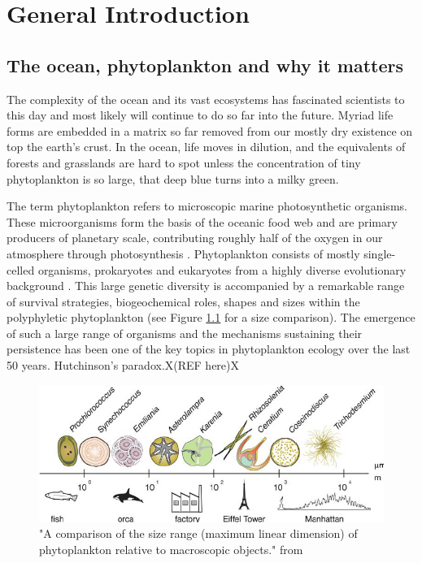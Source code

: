 \chapter{General Introduction}

\section{The ocean, phytoplankton and why it matters}
The complexity of the ocean and its vast ecosystems has fascinated scientists to this day and most likely will continue to do so far into the future. Myriad life forms are embedded in a matrix so far removed from our mostly dry existence on top the earth’s crust. In the ocean, life moves in dilution, and the equivalents of forests and grasslands are hard to spot unless the concentration of tiny phytoplankton is so large, that deep blue turns into a milky green.

The term phytoplankton refers to microscopic marine photosynthetic organisms. These microorganisms form the basis of the oceanic food web and are primary producers of planetary scale, contributing roughly half of the oxygen in our atmosphere through photosynthesis \citep{Field2009}. Phytoplankton consists of mostly single-celled organisms, prokaryotes and eukaryotes from a highly diverse evolutionary background \citep{Falkowski2004a}. This large genetic diversity is accompanied by a remarkable range of survival strategies, biogeochemical roles, shapes and sizes within the polyphyletic phytoplankton (see Figure \ref{FinkelPhySizeRange} for a size comparison). 
The emergence of such a large range of organisms and the mechanisms sustaining their persistence has been one of the key topics in phytoplankton ecology over the last 50 years. Hutchinson's paradox.X(REF here)X

\begin{figure}
\centering
\includegraphics[trim = 0mm 0mm 0mm 0mm, clip, width=.9\linewidth]{./Chp1-Intro/SIZEphytoComparison_FinkelEtAl2010.png}
\caption[Scheme]{\small {"A comparison of the size range (maximum linear dimension) of phytoplankton
relative to macroscopic objects." from \cite{Finkel2010}}}
\label{FinkelPhySizeRange}
\end{figure}

